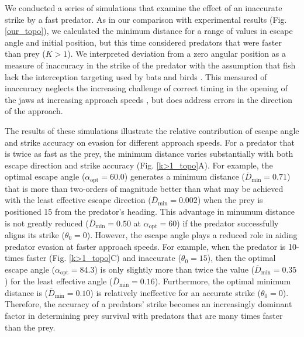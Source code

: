 \documentclass[12pt]{article}
\newcommand{\ol}{\overline}
\begin{document}
We conducted a series of simulations that examine the effect of an inaccurate strike by a fast predator. As in our comparison with experimental results (Fig. \ref{our_topo}), we calculated the minimum distance for a range of values in escape angle and initial position, but this time considered predators that were faster than prey ($K>1$). We interpreted deviation from a zero angular position as a measure of inaccuracy in the strike of the predator with the assumption that fish lack the interception targeting used by bats \citep{Ghose:2006dk} and birds \citep{Kane:2014fs}. This measured of inaccuracy neglects the increasing challenge of correct timing in the opening of the jaws at increasing approach speeds \citep{Kane:2014bh,Kane:2011hz}, but does address errors in the direction of the approach.

The results of these simulations illustrate the relative contribution of escape angle and strike accuracy on evasion for different approach speeds. For a predator that is twice as fast as the prey, the minimum distance varies substantially with both escape direction and strike accuracy (Fig. \ref{k>1_topo}A). For example, the optimal escape angle ($\alpha_{\text{opt}}=60.0$\textdegree) generates a minimum distance ($\ol D_{\text{min}}=0.71$) that is more than two-orders of magnitude better than what may be achieved with the least effective escape direction ($\ol D_{\text{min}}=0.002$) when the prey is positioned 15\textdegree\hspace{0.5pt} from the predator's heading. This advantage in minumum distance is not greatly reduced ($\ol D_{\text{min}}=0.50$ at $\alpha_{\text{opt}}=60$\textdegree) if the predator successfully aligns its strike ($\theta_0=0$\textdegree). However, the escape angle plays a reduced role in aiding predator evasion at faster approach speeds. For example, when the predator is 10-times faster  (Fig. \ref{k>1_topo}C) and inaccurate ($\theta_0=15$\textdegree), then the optimal escape angle ($\alpha_{\text{opt}}=84.3$\textdegree) is only slightly more than twice the value ($\ol D_{\text{min}}=0.35$) for the least effective angle ($\ol D_{\text{min}}=0.16$). Furthermore, the optimal minimum distance is ($\ol D_{\text{min}}=0.10$) is relatively ineffective for an accurate strike ($\theta_0=0$\textdegree). Therefore, the accuracy of a predators' strike becomes an increasingly dominant factor in determining prey survival with predators that are many times faster than the prey.

\end{document}

